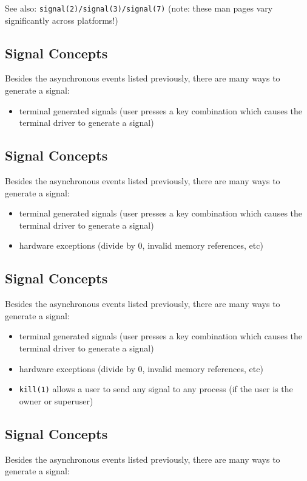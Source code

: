 \documentclass[xga]{xdvislides}
\begin{document}
See also: {\tt signal(2)/signal(3)/signal(7)} (note: these man pages vary
significantly across platforms!)
\subsection{Signal Concepts}
Besides the asynchronous events listed previously, there are many ways to
generate a signal:

\begin{itemize}
	\item terminal generated signals (user presses a key combination which causes
		the terminal driver to generate a signal)
\end{itemize}

\subsection{Signal Concepts}
Besides the asynchronous events listed previously, there are many ways to
generate a signal:

\begin{itemize}
	\item terminal generated signals (user presses a key combination which causes
		the terminal driver to generate a signal)
	\item hardware exceptions (divide by 0, invalid memory references, etc)
\end{itemize}

\subsection{Signal Concepts}
Besides the asynchronous events listed previously, there are many ways to
generate a signal:

\begin{itemize}
	\item terminal generated signals (user presses a key combination which causes
		the terminal driver to generate a signal)
	\item hardware exceptions (divide by 0, invalid memory references, etc)
	\item {\tt kill(1)} allows a user to send any signal to any process (if the
		user is the owner or superuser)
\end{itemize}

\subsection{Signal Concepts}
Besides the asynchronous events listed previously, there are many ways to
generate a signal:
\end{document}
